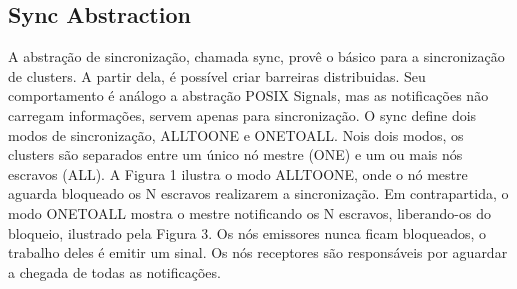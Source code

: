 


		\subsection{Sync Abstraction}
		\label{sec.sync-abs}

			A abstração de sincronização, chamada sync, provê o básico para a sincronização de clusters.
			A partir dela, é possível criar barreiras distribuidas.
			Seu comportamento é análogo a abstração POSIX Signals, mas as notificações não carregam informações, servem apenas para sincronização.
			O sync define dois modos de sincronização, ALLTOONE e ONETOALL.
			Nois dois modos, os clusters são separados entre um único nó mestre (ONE) e um ou mais nós escravos (ALL).
			A Figura 1 ilustra o modo ALLTOONE, onde o nó mestre aguarda bloqueado os N escravos realizarem a sincronização.
			Em contrapartida, o modo ONETOALL mostra o mestre notificando os N escravos, liberando-os do bloqueio, ilustrado pela Figura 3.
			Os nós emissores nunca ficam bloqueados, o trabalho deles é emitir um sinal.
			Os nós receptores são responsáveis por aguardar a chegada de todas as notificações.

